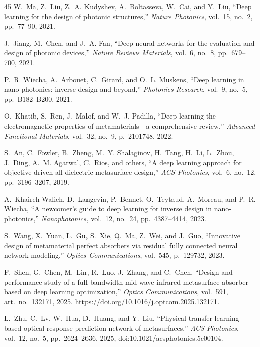 \documentclass[a4paper,fleqn]{cas-sc}
\begin{document}
\begin{thebibliography}{45}
W.~Ma, Z.~Liu, Z.~A. Kudyshev, A.~Boltasseva, W.~Cai, and Y.~Liu, ``Deep learning for the design of photonic structures,'' \textit{Nature Photonics}, vol.~15, no.~2, pp.~77--90, 2021.

J.~Jiang, M.~Chen, and J.~A. Fan, ``Deep neural networks for the evaluation and design of photonic devices,'' \textit{Nature Reviews Materials}, vol.~6, no.~8, pp.~679--700, 2021.

P.~R. Wiecha, A.~Arbouet, C.~Girard, and O.~L. Muskens, ``Deep learning in nano-photonics: inverse design and beyond,'' \textit{Photonics Research}, vol.~9, no.~5, pp.~B182--B200, 2021.

O.~Khatib, S.~Ren, J.~Malof, and W.~J. Padilla, ``Deep learning the electromagnetic properties of metamaterials---a comprehensive review,'' \textit{Advanced Functional Materials}, vol.~32, no.~9, p.~2101748, 2022.

S.~An, C.~Fowler, B.~Zheng, M.~Y. Shalaginov, H.~Tang, H.~Li, L.~Zhou, J.~Ding, A.~M. Agarwal, C.~Rios, and others, ``A deep learning approach for objective-driven all-dielectric metasurface design,'' \textit{ACS Photonics}, vol.~6, no.~12, pp.~3196--3207, 2019.

A.~Khaireh-Walieh, D.~Langevin, P.~Bennet, O.~Teytaud, A.~Moreau, and P.~R. Wiecha, ``A newcomer's guide to deep learning for inverse design in nano-photonics,'' \textit{Nanophotonics}, vol.~12, no.~24, pp.~4387--4414, 2023.

S.~Wang, X.~Yuan, L.~Gu, S.~Xie, Q.~Ma, Z.~Wei, and J.~Guo, ``Innovative design of metamaterial perfect absorbers via residual fully connected neural network modeling,'' \textit{Optics Communications}, vol.~545, p.~129732, 2023.

F.~Shen, G.~Chen, M.~Lin, R.~Luo, J.~Zhang, and C.~Chen, ``Design and performance study of a full-bandwidth mid-wave infrared metasurface absorber based on deep learning optimization,'' \textit{Optics Communications}, vol.~591, art.~no.~132171, 2025. \url{https://doi.org/10.1016/j.optcom.2025.132171}.

L.~Zhu, C.~Lv, W.~Hua, D.~Huang, and Y.~Liu, ``Physical transfer learning based optical response prediction network of metasurfaces,'' \textit{ACS Photonics}, vol.~12, no.~5, pp.~2624--2636, 2025, doi:10.1021/acsphotonics.5c00104.


\end{thebibliography}
\end{document}
